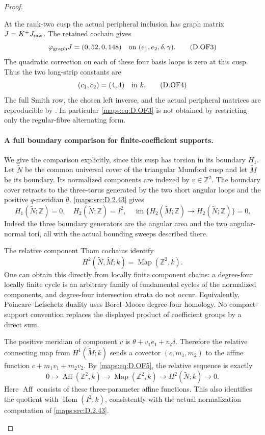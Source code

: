 \begin{proof}
\begin{enumerate}[label=\arabic*.,leftmargin=*]
At the rank-two cusp the actual peripheral inclusion has graph
matrix \(J=K^+J_{\rm raw}\). The retained cochain gives
\[
 \varphi_{\rm graph}J=(0,52,0,148)
       \quad\hbox{on }(e_1,e_2,\delta,\gamma).             \tag{D.OF3}\label{maps:eq:D.OF3}
\]
The quadratic correction on each of these four basis loops is zero
at this cusp. Thus the two long-strip constants are
\[
                      (c_1,c_2)=(4,4)\quad\hbox{in }k.   \tag{D.OF4}\label{maps:eq:D.OF4}
\]
The full Smith row, the chosen left inverse, and the actual
peripheral matrices are reproducible by
. In particular \eqref{maps:eq:D.OF3} is not
obtained by restricting only the regular-fibre alternating form.

\paragraph{A full boundary comparison for finite-coefficient supports.}
We give the comparison explicitly, since this cusp has torsion in
its boundary \(H_1\). Let \(\widetilde N\) be the common universal
cover of the triangular Mumford cusp and let
\(\widetilde M\) be its boundary. Its normalized components are
indexed by \(v\in\mathbb Z^2\). The boundary cover retracts to the
three-torus generated by the two short angular loops and the positive
\(q\)-meridian \(\theta\). \ref{maps:src:D.2.43} gives
\[
 H_1(\widetilde N;\mathbb Z)=0,\quad
 H_2(\widetilde N;\mathbb Z)=I^2,\quad
 \operatorname{im}\{H_2(\widetilde M;\mathbb Z)\to
                         H_2(\widetilde N;\mathbb Z)\}=0. \tag{D.OF5}\label{maps:eq:D.OF5}
\]
Indeed the three boundary generators are the
angular area and the two angular-normal tori, all with the actual
bounding sweeps described there.

The relative component Thom cochains identify
\[
 H^2(\widetilde N,\widetilde M;k)
                  =\operatorname{Map}(\mathbb Z^2,k).
\]
One can obtain this directly from locally finite
component chains: a degree-four locally finite cycle is an arbitrary
family of fundamental cycles of the normalized components, and
degree-four intersection strata do not occur. Equivalently,
Poincare--Lefschetz duality uses Borel--Moore degree-four homology.
No compact-support convention replaces the displayed product of
coefficient groups by a direct sum.

The positive meridian of component \(v\) is
\(\theta+v_1e_1+v_2\delta\). Therefore the relative connecting map
from \(H^1(\widetilde M;k)\) sends a covector \((c,m_1,m_2)\) to
the affine function \(c+m_1v_1+m_2v_2\). By \eqref{maps:eq:D.OF5}, the relative
sequence is exactly
\[
 0\longrightarrow\operatorname{Aff}(\mathbb Z^2,k)
 \longrightarrow\operatorname{Map}(\mathbb Z^2,k)
 \longrightarrow H^2(\widetilde N;k)\longrightarrow0.     \tag{D.OF6}\label{maps:eq:D.OF6}
\]
Here \(\operatorname{Aff}\) consists of these three-parameter
affine functions. This also identifies the quotient with
\(\operatorname{Hom}(I^2,k)\), consistently with the actual
normalization computation of \ref{maps:src:D.2.43}.


\end{enumerate}
\end{proof}
